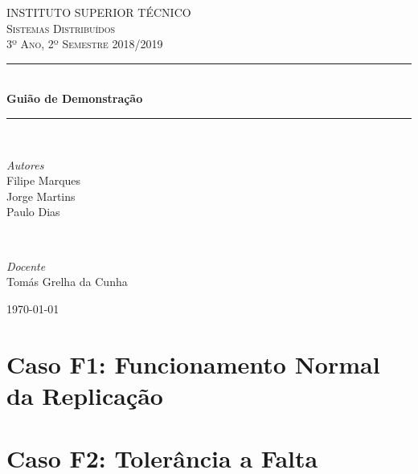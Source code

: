 \documentclass[a4paper]{article}
\begin{document}
\begin{titlepage}
	\newcommand{\HRule}{\rule{\linewidth}{0.5mm}}
	\center
	\textsc{\LARGE INSTITUTO SUPERIOR TÉCNICO}\\[1.0cm]
	\textsc{\Large Sistemas Distribuídos}\\[0.5cm]
	\textsc{\large 3º Ano, 2º Semestre 2018/2019}\\[0.2cm]
	
	\HRule\\[0.4cm]
	{\huge\bfseries Guião de Demonstração}\\[0.2cm]
	\HRule\\[1.5cm]
	
	\begin{minipage}{0.4\textwidth}
		\begin{flushleft}
		\large
		\textit{Autores}\\
		Filipe Marques\\
		Jorge Martins\\
		Paulo Dias
		\end{flushleft}
	\end{minipage}
	~
	\begin{minipage}{0.4\textwidth}
		\begin{flushright}
		\large
		\textit{Docente}\\
		Tomás Grelha da Cunha
		\end{flushright}
	\end{minipage}
	
	\vfill
	\vfill
	\vfill
	{\large\today}
	\vfill
\end{titlepage}
\section{Caso F1: Funcionamento Normal da Replicação}
\section{Caso F2: Tolerância a Falta}
\end{document}
